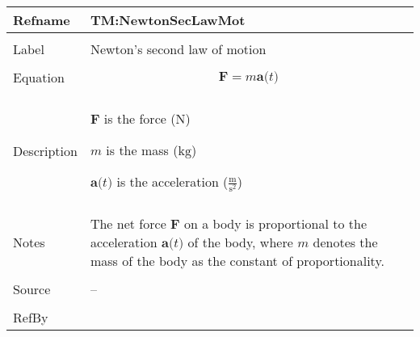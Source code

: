 \documentclass[12pt]{article}
\begin{document}
\begin{minipage}{\textwidth}
\begin{tabular}{>{\raggedright}p{}>{\raggedright\arraybackslash}p{}}
\toprule \textbf{Refname} & \textbf{TM:NewtonSecLawMot}
\label{TM:NewtonSecLawMot}
\\ \midrule \\
Label & Newton's second law of motion
        
\\ \midrule \\
Equation & \begin{displaymath}
           \symbf{F}=m \symbf{a}\text{(}t\text{)}
           \end{displaymath}
\\ \midrule \\
Description & \begin{symbDescription}
              \item{$\symbf{F}$ is the force (${\text{N}}$)}
              \item{$m$ is the mass (${\text{kg}}$)}
              \item{$\symbf{a}\text{(}t\text{)}$ is the acceleration ($\frac{\text{m}}{\text{s}^{2}}$)}
              \end{symbDescription}
\\ \midrule \\
Notes & The net force $\symbf{F}$ on a body is proportional to the acceleration $\symbf{a}\text{(}t\text{)}$ of the body, where $m$ denotes the mass of the body as the constant of proportionality.
        
\\ \midrule \\
Source & --
         
\\ \midrule \\
RefBy & 
\\ \bottomrule
\end{tabular}
\end{minipage}
\vspace{\baselineskip}
\noindent
\end{document}
